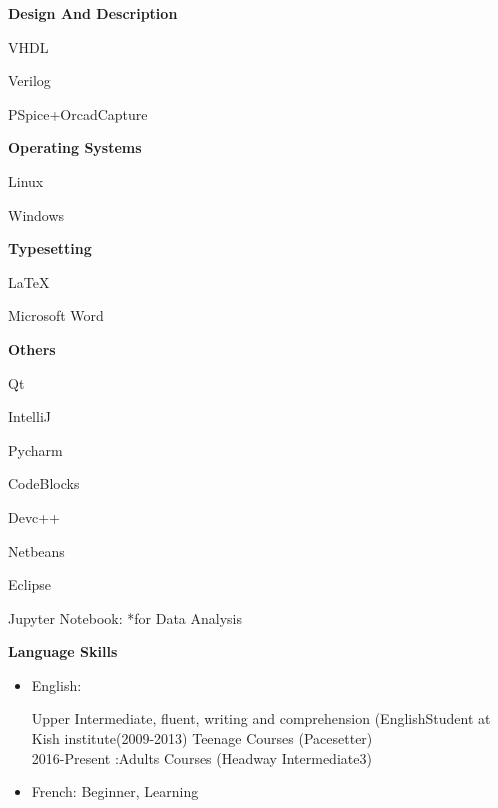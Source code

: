 \documentclass[a4paper,12pt,final]{memoir}
\newcommand{\SmallSep}{\vspace{0.5em}}
\newcommand{\CVItem}[1]
	{\textbf{\color{RoyalBlue} #1}}
\begin{document}
\CVItem{Design And Description}
\begin{multicols}{3}
\begin{compactitem}[\color{RoyalBlue}$\circ$]

	\item VHDL
	\item Verilog
	\item PSpice+OrcadCapture
\end{compactitem}
\end{multicols}
\SmallSep

\CVItem{Operating Systems}
\begin{multicols}{3}
\begin{compactitem}[\color{RoyalBlue}$\circ$]
	\item Linux
	\item Windows
\end{compactitem}
\end{multicols}
\SmallSep
\CVItem{Typesetting}
\begin{multicols}{3}
\begin{compactitem}[\color{RoyalBlue}$\circ$]
	\item LaTeX
	\item Microsoft Word
\end{compactitem}
\end{multicols}
\SmallSep
\CVItem{Others}
\begin{multicols}{3}
\begin{compactitem}[\color{RoyalBlue}$\circ$]
	\item Qt
	\item IntelliJ
	\item Pycharm
    	\item  CodeBlocks
    		\item Devc++
    			\item Netbeans
    			\item Eclipse
    			\item Jupyter Notebook:
    			*for Data Analysis
    			
    
    			
    		
    			
\end{compactitem}
\end{multicols}


\SmallSep
\CVItem{Language Skills}
	\begin{itemize}[$\circ$]

\item English: 

Upper Intermediate, fluent, writing and comprehension
(EnglishStudent at Kish institute(2009-2013) Teenage Courses (Pacesetter)  \\
2016-Present :Adults Courses (Headway Intermediate3)
\item French: Beginner, Learning
	\end{itemize}
\end{document}
